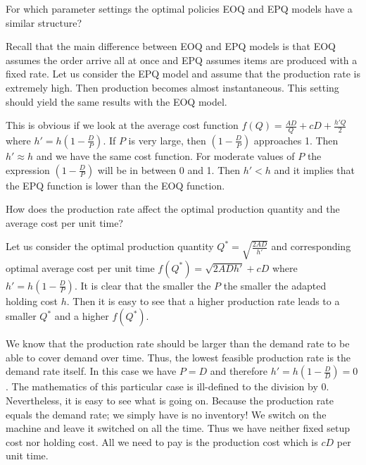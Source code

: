 \begin{exercise}
For which parameter settings the optimal policies EOQ and EPQ models have a similar structure? 


\begin{solution}
Recall that the main difference between EOQ and EPQ models is that EOQ assumes the order arrive all at once and EPQ assumes items are produced with a fixed rate. Let us consider the EPQ model and assume that the production rate is extremely high. Then production becomes almost instantaneous. This setting should yield the same results with the EOQ model.

This is obvious if we look at the average cost function $f(Q) = \frac{AD}{Q}+cD+\frac{h'Q}{2}$ where $h'=h\left(1-\frac{D}{P}\right)$. If $P$ is very large, then 
$\left(1-\frac{D}{P}\right)$ approaches 1. Then $h'\approx h$ and we have the same cost function. For moderate values of $P$ the expression $\left(1-\frac{D}{P}\right)$ will be in between 0 and 1. Then $h'<h$ and it implies that the EPQ function is lower than the EOQ function.
\end{solution}
\end{exercise}

\begin{exercise}
How does the production rate affect the optimal production quantity and the average cost per unit time?


\begin{solution}
Let us consider the optimal production quantity $Q^*=\sqrt{\frac{2AD}{h'}}$ and corresponding optimal average cost per unit time $f(Q^*)=\sqrt{2ADh'}+cD$ where $h'=h\left(1-\frac{D}{P}\right)$. It is clear that the smaller the $P$ the smaller the adapted holding cost $h$. Then it is easy to see that a higher production rate leads to a smaller $Q^*$ and a higher $f(Q^*)$. 

We know that the production rate should be larger than the demand rate to be able to cover demand over time. Thus, the lowest feasible production rate is the demand rate itself. In this case we have $P=D$ and therefore $h'=h\left(1-\frac{D}{D}\right)=0$. The mathematics of this particular case is ill-defined to the division by 0. Nevertheless, it is easy to see what is going on. Because the production rate equals the demand rate; we simply have is no inventory! We switch on the machine and leave it switched on all the time. Thus we have neither fixed setup cost nor holding cost. All we need to pay is the production cost which is $cD$ per unit time.
\end{solution}
\end{exercise}

